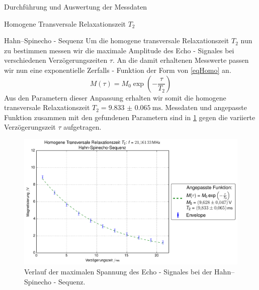 \documentclass[pdftex, a4paper,11pt, twoside, ngerman]{report}
\begin{document}
\begin{chapter}{Durchführung und Auswertung der Messdaten}
\begin{section}{
        Homogene Transversale Relaxationszeit $T_{2}$}
\begin{subsection}{Hahn--Spinecho - Sequenz}
        Um die homogene transversale Relaxationszeit $T_{2}$ nun zu bestimmen
        messen wir die maximale Amplitude des Echo - Signales bei verschiedenen
        Verzögerungszeiten $\tau$.
        An die damit erhaltenen Messwerte passen wir nun eine exponentielle
        Zerfalls - Funktion der Form von \cref{eqHomo} an.
        \begin{equation}
          \label{eqHomo}
          M(\tau)=M_{0}\exp\left(-\frac{\tau}{T_{2}}\right)
        \end{equation}
        Aus den Parametern dieser Anpassung erhalten wir somit die homogene
        transversale Relaxationszeit $T_{2}=\SI{9.833(65)}{\milli\second}$.
        Messdaten und angepasste Funktion zusammen mit den gefundenen
        Parametern sind in \cref{figHahn} gegen die variierte Verzögerungszeit
        $\tau$ aufgetragen.
        \begin{figure}[htb]
          \centering
          \includegraphics[width=\textwidth]
          {Figures/HomoTransRelax_Hahn.png}
          \caption{Verlauf der maximalen Spannung des Echo - Signales bei der
            Hahn--Spinecho - Sequenz.}
          \label{figHahn}
        \end{figure}
        \begin{figure}[htb]
          \centering
          \begin{minipage}{.48\textwidth}
            \centering

\end{minipage}
\end{figure}
\end{subsection}
\end{section}
\end{chapter}
\end{document}
